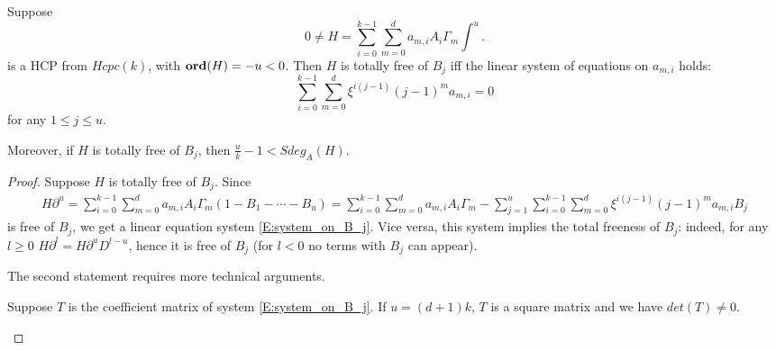 \documentclass[10pt,a4paper]{amsart}
\newcommand{\Ord}{\mathop {\rm \bf ord}}
\begin{document}
\begin{Prop}
\label{P:lower estimate}
Suppose 
$$
0\neq H=\sum_{i=0}^{k-1}\sum_{m=0}^da_{m,i}A_i\Gamma_m\int^u.
$$ 	
is a HCP  from $Hcpc(k)$,  with $\Ord(H)=-u<0$. Then $H$ is totally free of $B_j$ iff the linear system of equations on $a_{m,i}$ holds:
\begin{equation}
\label{E:system_on_B_j}
\sum_{i=0}^{k-1}\sum_{m=0}^d\xi^{i(j-1)}(j-1)^ma_{m,i}=0
\end{equation}
for any $1\leq j\leq u$.

Moreover, if $H$ is totally free of $B_j$, then $\frac{u}{k}-1< Sdeg_A(H).$
\end{Prop}

\begin{proof}
    Suppose  $H$ is totally free of $B_j$. Since 
\begin{multline*}
	H\partial^u=\sum_{i=0}^{k-1}\sum_{m=0}^da_{m,i}A_i\Gamma_m(1-B_1-\cdots-B_{u})
	=\sum_{i=0}^{k-1}\sum_{m=0}^da_{m,i}A_i\Gamma_m-\sum_{j=1}^{u}\sum_{i=0}^{k-1}\sum_{m=0}^d\xi^{i(j-1)}(j-1)^ma_{m,i}B_j
\end{multline*}
is free of $B_j$, we get a linear equation system \eqref{E:system_on_B_j}. Vice versa, this system implies the total freeness of $B_j$: indeed, for any $l\ge 0$ $H\partial^l= H\partial^u D^{l-u}$, hence it is free of $B_j$ (for $l<0$  no terms with $B_j$ can appear). 

The second statement requires more technical arguments. 
   
 
\begin{lemma}
	\label{L:Tkdu full rank when u=(d+1)k}
	Suppose $T$ is the coefficient matrix of  system \eqref{E:system_on_B_j}. If $u=(d+1)k$, $T$ is a square matrix and we have $det(T)\neq 0$.
\end{lemma}


\end{proof}
\end{document}

